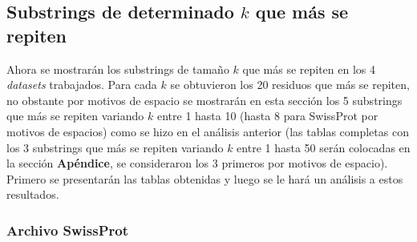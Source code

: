 \subsection{Substrings de determinado $k$ que más se repiten}

Ahora se mostrarán los substrings de tamaño $k$ que más se repiten en los 4 \textit{datasets} trabajados. Para cada $k$ se obtuvieron los 20 residuos que más se repiten, no obstante por motivos de espacio se mostrarán en esta sección los 5 substrings que más se repiten variando $k$ entre 1 hasta 10 (hasta 8 para SwissProt por motivos de espacios) como se hizo en el análisis anterior (las tablas completas con los 3 substrings que más se repiten variando $k$ entre 1 hasta 50 serán colocadas en la sección \textbf{Apéndice}, se consideraron los 3 primeros por motivos de espacio). Primero se presentarán las tablas obtenidas y luego se le hará un análisis a estos resultados.

\subsubsection{Archivo SwissProt}

